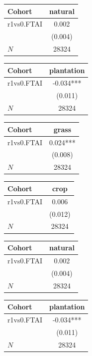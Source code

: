 {
\def\sym#1{\ifmmode^{#1}\else\(^{#1}\)\fi}
\begin{tabular}{l*{1}{c}}
\toprule
Cohort    &  natural   \\
\midrule
r1vs0.FTAI&    0.002   \\
          &  (0.004)   \\
\midrule
\(N\)     &    28324   \\
\bottomrule
\end{tabular}
}
{
\def\sym#1{\ifmmode^{#1}\else\(^{#1}\)\fi}
\begin{tabular}{l*{1}{c}}
\toprule
Cohort    &plantation   \\
\midrule
r1vs0.FTAI&   -0.034***\\
          &  (0.011)   \\
\midrule
\(N\)     &    28324   \\
\bottomrule
\end{tabular}
}
{
\def\sym#1{\ifmmode^{#1}\else\(^{#1}\)\fi}
\begin{tabular}{l*{1}{c}}
\toprule
Cohort    &    grass   \\
\midrule
r1vs0.FTAI&    0.024***\\
          &  (0.008)   \\
\midrule
\(N\)     &    28324   \\
\bottomrule
\end{tabular}
}
{
\def\sym#1{\ifmmode^{#1}\else\(^{#1}\)\fi}
\begin{tabular}{l*{1}{c}}
\toprule
Cohort    &     crop   \\
\midrule
r1vs0.FTAI&    0.006   \\
          &  (0.012)   \\
\midrule
\(N\)     &    28324   \\
\bottomrule
\end{tabular}
}
{
\def\sym#1{\ifmmode^{#1}\else\(^{#1}\)\fi}
\begin{tabular}{l*{1}{c}}
\toprule
Cohort    &  natural   \\
\midrule
r1vs0.FTAI&    0.002   \\
          &  (0.004)   \\
\midrule
\(N\)     &    28324   \\
\bottomrule
\end{tabular}
}
{
\def\sym#1{\ifmmode^{#1}\else\(^{#1}\)\fi}
\begin{tabular}{l*{1}{c}}
\toprule
Cohort    &plantation   \\
\midrule
r1vs0.FTAI&   -0.034***\\
          &  (0.011)   \\
\midrule
\(N\)     &    28324   \\
\bottomrule
\end{tabular}
}
